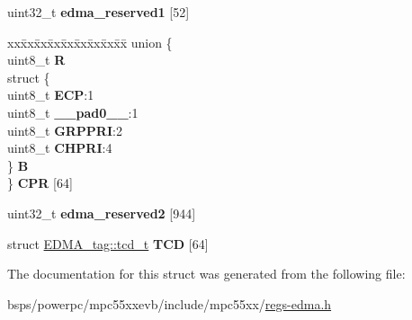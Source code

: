 \begin{DoxyCompactItemize}
\begin{tabbing}
\end{tabbing}\item 
\mbox{\label{structEDMA__tag_ace8233df4067c5ac83a9e6519a2717e6}} 
uint32\+\_\+t {\bfseries edma\+\_\+reserved1} \mbox{[}52\mbox{]}
\item 
\mbox{\label{structEDMA__tag_a427b26cf9aa1920dbfe78643aaa731fc}} 
\begin{tabbing}
xx\=xx\=xx\=xx\=xx\=xx\=xx\=xx\=xx\=\kill
union \{\\
\>uint8\_t {\bfseries R}\\
\>struct \{\\
\>\>uint8\_t {\bfseries ECP}:1\\
\>\>uint8\_t {\bfseries \_\_pad0\_\_}:1\\
\>\>uint8\_t {\bfseries GRPPRI}:2\\
\>\>uint8\_t {\bfseries CHPRI}:4\\
\>\} {\bfseries B}\\
\} {\bfseries CPR} \mbox{[}64\mbox{]}\\

\end{tabbing}\item 
\mbox{\label{structEDMA__tag_a7baf43e900f3f826c96e45ab91b8d842}} 
uint32\+\_\+t {\bfseries edma\+\_\+reserved2} \mbox{[}944\mbox{]}
\item 
\mbox{\label{structEDMA__tag_a99f755c86a5efc5dd2145fd3fb5ae2cc}} 
struct \mbox{\hyperlink{structEDMA__tag_1_1tcd__t}{E\+D\+M\+A\+\_\+tag\+::tcd\+\_\+t}} {\bfseries T\+CD} \mbox{[}64\mbox{]}
\end{DoxyCompactItemize}


The documentation for this struct was generated from the following file\+:\begin{DoxyCompactItemize}
\item 
bsps/powerpc/mpc55xxevb/include/mpc55xx/\mbox{\hyperlink{regs-edma_8h}{regs-\/edma.\+h}}\end{DoxyCompactItemize}
